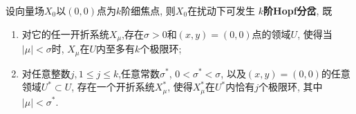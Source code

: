 \begin{theorem}
  \label{thm:2.3.6}
  设向量场$X_0$以$(0,0)$点为$k$阶细焦点,
  则$X_0$在扰动下可发生 \textbf{$k$阶Hopf分岔},
  既
  
\begin{enumerate}
\item\label{item:6}
  对它的任一开折系统$X_{\mu}$,存在$\sigma>0$和$(x,y)=(0,0)$点的领域$U$,
  使得当$|\mu|<\sigma$时,
  $X_{\mu}$在$U$内至多有$k$个极限环;
\item\label{item:7}
  对任意整数$j, 1 \leqslant j \leqslant k$,任意常数$\sigma^{*}$,
  $0<\sigma^{*}<\sigma$,
  以及$(x,y)=(0,0)$的任意领域$U^{*} \subset U$,
  存在一个开折系统$X_{\mu}^{*} $,
  使得$X_{\mu}^{*}$在$U^{*}$内恰有$j$个极限环,
  其中$|\mu|<\sigma^{*}$.
\end{enumerate}
\end{theorem}

